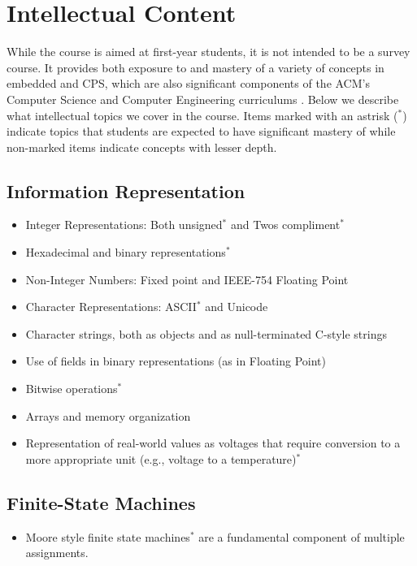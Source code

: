\section{Intellectual Content}
\label{sec:topics}

While the course is aimed at first-year students, it is not intended to be a survey course.  It provides both exposure to and mastery of a variety of concepts in embedded and CPS, which are also significant components of the ACM's Computer Science and Computer Engineering curriculums \cite{cs13, ce16}.  Below we describe what intellectual topics we cover in the course.  Items marked with an astrisk ($^*$)   indicate topics that students are expected to have significant mastery of while non-marked items indicate concepts with lesser depth.

\subsection{Information Representation}
\label{sec:ip}
\begin{itemize}
  \item Integer Representations: Both unsigned$^*$ and Twos compliment$^*$
  \item Hexadecimal and binary representations$^*$
  \item Non-Integer Numbers: Fixed point and IEEE-754 Floating Point
  \item Character Representations: ASCII$^*$ and Unicode
  \item Character strings, both as objects and as null-terminated C-style strings
  \item Use of fields in binary representations (as in Floating Point)
  \item Bitwise operations$^*$
  \item Arrays and memory organization
  \item Representation of real-world values as voltages that require conversion to a more appropriate unit (e.g., voltage to a temperature)$^*$
\end{itemize}

\subsection{Finite-State Machines}
\label{sec:fsm}
\begin{itemize}
\item Moore style finite state machines$^*$ are a fundamental component of multiple assignments.
\end{itemize}

